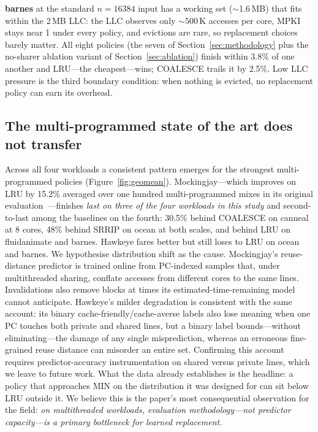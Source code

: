 \documentclass[conference]{IEEEtran}
\begin{document}
\textbf{barnes} at the standard $n{=}16384$ input has a working set ($\sim$1.6\,MB) that fits within the 2\,MB LLC: the LLC observes only ${\sim}500$\,K accesses per core, MPKI stays near 1 under every policy, and evictions are rare, so replacement choices barely matter. All eight policies (the seven of Section~\ref{sec:methodology} plus the no-sharer ablation variant of Section~\ref{sec:ablation}) finish within 3.8\% of one another and LRU---the cheapest---wins; COALESCE trails it by 2.5\%. Low LLC pressure is the third boundary condition: when nothing is evicted, no replacement policy can earn its overhead.

\subsection{The multi-programmed state of the art does not transfer}
\label{sec:mockingjay}

Across all four workloads a consistent pattern emerges for the strongest multi-programmed policies (Figure~\ref{fig:geomean}). Mockingjay---which improves on LRU by 15.2\% averaged over one hundred multi-programmed mixes in its original evaluation~\cite{shah2022mockingjay}---finishes \emph{last on three of the four workloads in this study} and second-to-last among the baselines on the fourth: 30.5\% behind COALESCE on canneal at 8 cores, 48\% behind SRRIP on ocean at both scales, and behind LRU on fluidanimate and barnes. Hawkeye fares better but still loses to LRU on ocean and barnes. We hypothesise distribution shift as the cause. Mockingjay's reuse-distance predictor is trained online from PC-indexed samples that, under multithreaded sharing, conflate accesses from different cores to the same lines. Invalidations also remove blocks at times its estimated-time-remaining model cannot anticipate. Hawkeye's milder degradation is consistent with the same account: its binary cache-friendly/cache-averse labels also lose meaning when one PC touches both private and shared lines, but a binary label bounds---without eliminating---the damage of any single misprediction, whereas an erroneous fine-grained reuse distance can misorder an entire set. Confirming this account requires predictor-accuracy instrumentation on shared versus private lines, which we leave to future work. What the data already establishes is the headline: a policy that approaches MIN on the distribution it was designed for can sit below LRU outside it. We believe this is the paper's most consequential observation for the field: \emph{on multithreaded workloads, evaluation methodology---not predictor capacity---is a primary bottleneck for learned replacement.}
\end{document}
